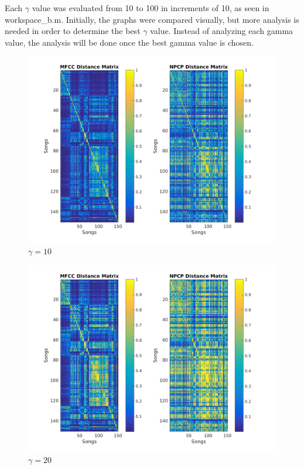 \documentclass[11pt, a4paper]{article}
\begin{document}


Each $\gamma$ value was evaluated from 10 to 100 in increments of 10, as seen in workspace\_b.m. Initially, the graphs were compared visually, but more analysis is needed in order to determine the best $\gamma$ value. Instead of analyzing each gamma value, the analysis will be done once the best gamma value is chosen.

\pagebreak

\begin{figure}[H]
\hspace*{-2cm}    
    \centering
    \includegraphics[width=1.25\textwidth]{gamma10.png}
    \caption{$\gamma = 10$}
\end{figure}

\begin{figure}[H]
\hspace*{-2cm}    
    \centering
    \includegraphics[width=1.25\textwidth]{gamma20.png}
    \caption{$\gamma = 20$}
\end{figure}
\end{document}
